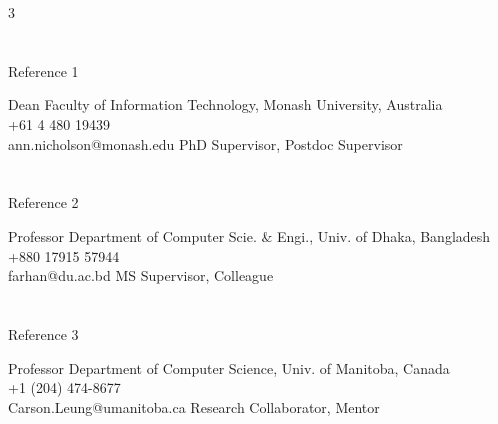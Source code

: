 \documentclass{my_cv}
\begin{document}
\begin{multicols}{3}

\section{\faUniversity}{Reference 1}
    
%
    {Dean}%
    {Faculty of Information Technology, Monash University, Australia\\ 
    \faPhone \hspace{5pt} +61 4 480 19439 \hspace{20pt}\\
    \faEnvelope \hspace{5pt} ann.nicholson@monash.edu}
    {PhD Supervisor, Postdoc Supervisor}



\columnbreak

\section{\faInstitution}{Reference 2}

%
    {Professor}%
    {Department of Computer Scie. \& Engi., Univ. of Dhaka, Bangladesh\\
    \faPhone \hspace{5pt} +880 17915 57944 \hspace{20pt}\\
    \faEnvelope \hspace{5pt} farhan@du.ac.bd}
    {MS Supervisor, Colleague}


\columnbreak

\section{\faInstitution}{Reference 3}

%
    {Professor}%
    {Department of Computer Science, Univ. of Manitoba, Canada\\
    \faPhone \hspace{5pt}  +1 (204) 474-8677 \hspace{20pt}\\
    \faEnvelope \hspace{5pt} Carson.Leung@umanitoba.ca}
    {Research Collaborator, Mentor}

\end{multicols}
\end{document}
